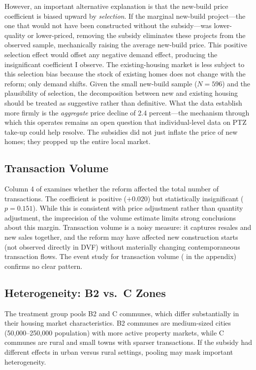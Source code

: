 \documentclass[12pt]{article}
\begin{document}
However, an important alternative explanation is that the new-build price coefficient is biased upward by \textit{selection}. If the marginal new-build project---the one that would not have been constructed without the subsidy---was lower-quality or lower-priced, removing the subsidy eliminates these projects from the observed sample, mechanically raising the average new-build price. This positive selection effect would offset any negative demand effect, producing the insignificant coefficient I observe. The existing-housing market is less subject to this selection bias because the stock of existing homes does not change with the reform; only demand shifts. Given the small new-build sample ($N = 596$) and the plausibility of selection, the decomposition between new and existing housing should be treated as suggestive rather than definitive. What the data establish more firmly is the \textit{aggregate} price decline of 2.4 percent---the mechanism through which this operates remains an open question that individual-level data on PTZ take-up could help resolve. The subsidies did not just inflate the price of new homes; they propped up the entire local market.

\subsection{Transaction Volume}

Column 4 of  examines whether the reform affected the total number of transactions. The coefficient is positive ($+0.020$) but statistically insignificant ($p = 0.151$). While this is consistent with price adjustment rather than quantity adjustment, the imprecision of the volume estimate limits strong conclusions about this margin. Transaction volume is a noisy measure: it captures resales and new sales together, and the reform may have affected new construction starts (not observed directly in DVF) without materially changing contemporaneous transaction flows. The event study for transaction volume ( in the appendix) confirms no clear pattern.


\subsection{Heterogeneity: B2 vs.\ C Zones}

The treatment group pools B2 and C communes, which differ substantially in their housing market characteristics. B2 communes are medium-sized cities (50,000--250,000 population) with more active property markets, while C communes are rural and small towns with sparser transactions. If the subsidy had different effects in urban versus rural settings, pooling may mask important heterogeneity.
\end{document}
